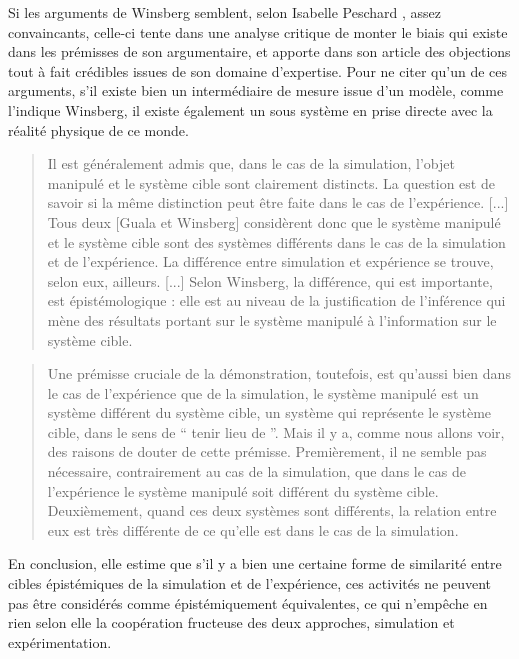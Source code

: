 Si les arguments de Winsberg semblent, selon Isabelle Peschard \autocites{Peschard2010b, Peschard2013}, assez convaincants, celle-ci tente dans une analyse critique de monter le biais qui existe dans les prémisses de son argumentaire, et apporte dans son article des objections tout à fait crédibles issues de son domaine d'expertise. Pour ne citer qu'un de ces arguments, s'il existe bien un intermédiaire de mesure issue d'un modèle, comme l'indique Winsberg, il existe également un sous système en prise directe avec la réalité physique de ce monde.

\blockquote[\cite{Peschard2013}]{Il est généralement admis que, dans le cas de la simulation, l'objet manipulé et le système cible sont clairement distincts. La question est de savoir si la même distinction peut être faite dans le cas de l'expérience. [...] Tous deux [Guala et Winsberg] considèrent donc que le système manipulé et le système cible sont des systèmes différents dans le cas de la simulation et de l'expérience. La différence entre simulation et expérience se trouve, selon eux, ailleurs. [...] Selon Winsberg, la différence, qui est importante, est épistémologique : elle est au niveau de la justification de l'inférence qui mène des résultats portant sur le système manipulé à l'information sur le système cible.}

\blockquote[\cite{Peschard2013}]{Une prémisse cruciale de la démonstration, toutefois, est qu’aussi bien dans le cas de l’expérience que de la simulation, le système manipulé est un système différent du système cible, un système qui représente le système cible, dans le sens de \enquote{ tenir lieu de }. Mais il y a, comme nous allons voir, des raisons de douter de cette prémisse. Premièrement, il ne semble pas nécessaire, contrairement au cas de la simulation, que dans le cas de l’expérience le système manipulé soit différent du système cible. Deuxièmement, quand ces deux systèmes sont différents, la relation entre eux est très différente de ce qu’elle est dans le cas de la simulation.}

En conclusion, elle estime que s'il y a bien une certaine forme de similarité entre cibles épistémiques de la simulation et de l'expérience, ces activités ne peuvent pas être considérés comme épistémiquement équivalentes, ce qui n'empêche en rien selon elle la coopération fructeuse des deux approches, simulation et expérimentation.

